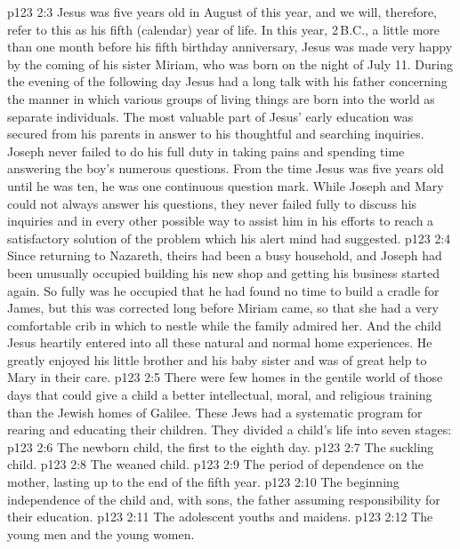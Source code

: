 \vs p123 2:3 \pc Jesus was five years old in August of this year, and we will, therefore, refer to this as his fifth (calendar) year of life. In this year, 2\,B.C., a little more than one month before his fifth birthday anniversary, Jesus was made very happy by the coming of his sister Miriam, who was born on the night of July 11. During the evening of the following day Jesus had a long talk with his father concerning the manner in which various groups of living things are born into the world as separate individuals. The most valuable part of Jesus’ early education was secured from his parents in answer to his thoughtful and searching inquiries. Joseph never failed to do his full duty in taking pains and spending time answering the boy’s numerous questions. From the time Jesus was five years old until he was ten, he was one continuous question mark. While Joseph and Mary could not always answer his questions, they never failed fully to discuss his inquiries and in every other possible way to assist him in his efforts to reach a satisfactory solution of the problem which his alert mind had suggested.
\vs p123 2:4 Since returning to Nazareth, theirs had been a busy household, and Joseph had been unusually occupied building his new shop and getting his business started again. So fully was he occupied that he had found no time to build a cradle for James, but this was corrected long before Miriam came, so that she had a very comfortable crib in which to nestle while the family admired her. And the child Jesus heartily entered into all these natural and normal home experiences. He greatly enjoyed his little brother and his baby sister and was of great help to Mary in their care.
\vs p123 2:5 There were few homes in the gentile world of those days that could give a child a better intellectual, moral, and religious training than the Jewish homes of Galilee. These Jews had a systematic program for rearing and educating their children. They divided a child’s life into seven stages:
\vs p123 2:6 \bibnobreakspace The newborn child, the first to the eighth day.
\vs p123 2:7 \bibnobreakspace The suckling child.
\vs p123 2:8 \bibnobreakspace The weaned child.
\vs p123 2:9 \bibnobreakspace The period of dependence on the mother, lasting up to the end of the fifth year.
\vs p123 2:10 \bibnobreakspace The beginning independence of the child and, with sons, the father assuming responsibility for their education.
\vs p123 2:11 \bibnobreakspace The adolescent youths and maidens.
\vs p123 2:12 \bibnobreakspace The young men and the young women.
